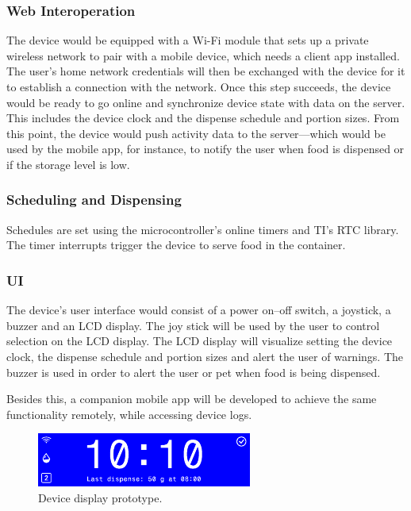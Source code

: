\documentclass{article}
\begin{document}
\subsubsection{Web Interoperation}
The device would be equipped with a Wi-Fi module that sets up a private wireless network to pair with a mobile device, which needs a client app installed. The user's home network credentials will then be exchanged with the device for it to establish a connection with the network. Once this step succeeds, the device would be ready to go online and synchronize device state with data on the server. This includes the device clock and the dispense schedule and portion sizes. From this point, the device would push activity data to the server---which would be used by the mobile app, for instance, to notify the user when food is dispensed or if the storage level is low.
\subsubsection{Scheduling and Dispensing}
Schedules are set using the microcontroller's online timers and TI's RTC library. The timer interrupts trigger the device to serve food in the container.
\subsubsection{UI}
The device's user interface would consist of a power on--off switch, a joystick, a buzzer and an LCD display. The joy stick will be used by the user to control selection on the LCD display. The LCD display will visualize setting the device clock, the dispense schedule and portion sizes and alert the user of warnings. The buzzer is used in order to alert the user or pet when food is being dispensed.

Besides this, a companion mobile app will be developed to achieve the same functionality remotely, while accessing device logs.
\begin{figure}[H]
    \includegraphics[width=\textwidth]{images/displayframe.pdf}
    \caption{Device display prototype.}
\end{figure}
\end{document}
